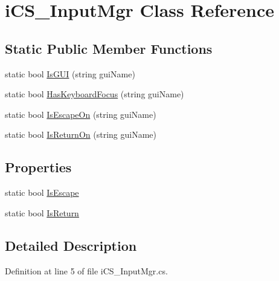 \hypertarget{classi_c_s___input_mgr}{\section{i\+C\+S\+\_\+\+Input\+Mgr Class Reference}
\label{classi_c_s___input_mgr}
}
\subsection*{Static Public Member Functions}
\begin{DoxyCompactItemize}
\item 
static bool \hyperlink{classi_c_s___input_mgr_a2ea00337625a1d76921920279153054c}{Is\+G\+U\+I} (string gui\+Name)
\item 
static bool \hyperlink{classi_c_s___input_mgr_a54f83112ed102bc352fbb10cb9f5df0a}{Has\+Keyboard\+Focus} (string gui\+Name)
\item 
static bool \hyperlink{classi_c_s___input_mgr_a0813d314b41eeaf36d318ddce1ca3b7c}{Is\+Escape\+On} (string gui\+Name)
\item 
static bool \hyperlink{classi_c_s___input_mgr_ab8aef8e4f53fbda250f9fc74e5f261aa}{Is\+Return\+On} (string gui\+Name)
\end{DoxyCompactItemize}
\subsection*{Properties}
\begin{DoxyCompactItemize}
\item 
static bool \hyperlink{classi_c_s___input_mgr_a1c71606061d59a7c14e33277821dfb6b}{Is\+Escape}
\item 
static bool \hyperlink{classi_c_s___input_mgr_a2465d85b264724a970dd8e53888c260f}{Is\+Return}
\end{DoxyCompactItemize}


\subsection{Detailed Description}


Definition at line 5 of file i\+C\+S\+\_\+\+Input\+Mgr.\+cs.



